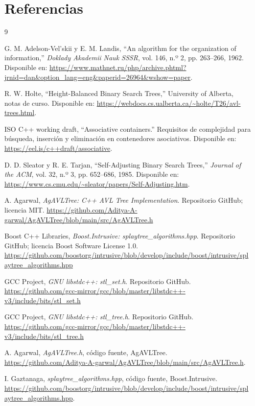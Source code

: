 \documentclass[11pt,letterpaper]{article}
\begin{document}
\newpage
\section{Referencias}



\begingroup
\renewcommand{\section}[2]{}%
\begin{thebibliography}{9}

G. M. Adelson-Vel'skii y E. M. Landis,
``An algorithm for the organization of information,''
\textit{Doklady Akademii Nauk SSSR}, vol. 146, n.º 2, pp. 263--266, 1962.
Disponible en:
\url{https://www.mathnet.ru/php/archive.phtml?jrnid=dan&option_lang=eng&paperid=26964&wshow=paper}.

R. W. Holte,
``Height-Balanced Binary Search Trees,''
University of Alberta, notas de curso.
Disponible en:
\url{https://webdocs.cs.ualberta.ca/~holte/T26/avl-trees.html}.

ISO C++ working draft,
``Associative containers.''
Requisitos de complejidad para búsqueda, inserción y eliminación en
contenedores asociativos.
Disponible en:
\url{https://eel.is/c++draft/associative}.

D. D. Sleator y R. E. Tarjan,
``Self-Adjusting Binary Search Trees,''
\textit{Journal of the ACM}, vol. 32, n.º 3, pp. 652--686, 1985.
Disponible en:
\url{https://www.cs.cmu.edu/~sleator/papers/Self-Adjusting.htm}.


A. Agarwal,
\textit{AgAVLTree: C++ AVL Tree Implementation}.
Repositorio GitHub; licencia MIT.
\url{https://github.com/Aditya-A-garwal/AgAVLTree/blob/main/src/AgAVLTree.h}

Boost C++ Libraries,
\textit{Boost.Intrusive: splaytree\_algorithms.hpp}.
Repositorio GitHub; licencia Boost Software License 1.0.
\url{https://github.com/boostorg/intrusive/blob/develop/include/boost/intrusive/splaytree_algorithms.hpp}

GCC Project,
\textit{GNU libstdc++: stl\_set.h}.
Repositorio GitHub.
\url{https://github.com/gcc-mirror/gcc/blob/master/libstdc++-v3/include/bits/stl_set.h}

GCC Project,
\textit{GNU libstdc++: stl\_tree.h}.
Repositorio GitHub.
\url{https://github.com/gcc-mirror/gcc/blob/master/libstdc++-v3/include/bits/stl_tree.h}

A. Agarwal,
\textit{AgAVLTree.h},
código fuente, AgAVLTree.
\url{https://github.com/Aditya-A-garwal/AgAVLTree/blob/main/src/AgAVLTree.h}.

I. Gaztanaga,
\textit{splaytree\_algorithms.hpp},
código fuente, Boost.Intrusive.
\url{https://github.com/boostorg/intrusive/blob/develop/include/boost/intrusive/splaytree_algorithms.hpp}.

\end{thebibliography}
\end{document}

